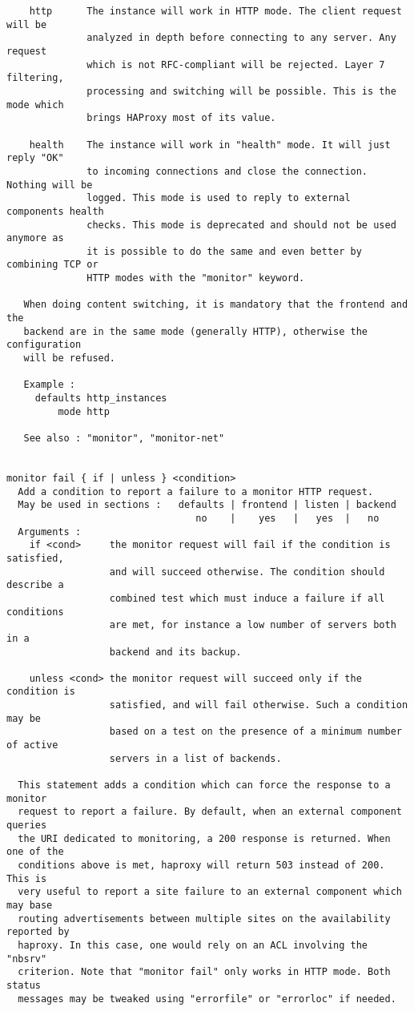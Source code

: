 \begin{verbatim}
    http      The instance will work in HTTP mode. The client request will be
              analyzed in depth before connecting to any server. Any request
              which is not RFC-compliant will be rejected. Layer 7 filtering,
              processing and switching will be possible. This is the mode which
              brings HAProxy most of its value.

    health    The instance will work in "health" mode. It will just reply "OK"
              to incoming connections and close the connection. Nothing will be
              logged. This mode is used to reply to external components health
              checks. This mode is deprecated and should not be used anymore as
              it is possible to do the same and even better by combining TCP or
              HTTP modes with the "monitor" keyword.

   When doing content switching, it is mandatory that the frontend and the
   backend are in the same mode (generally HTTP), otherwise the configuration
   will be refused.

   Example :
     defaults http_instances
         mode http

   See also : "monitor", "monitor-net"


monitor fail { if | unless } <condition>
  Add a condition to report a failure to a monitor HTTP request.
  May be used in sections :   defaults | frontend | listen | backend
                                 no    |    yes   |   yes  |   no
  Arguments :
    if <cond>     the monitor request will fail if the condition is satisfied,
                  and will succeed otherwise. The condition should describe a
                  combined test which must induce a failure if all conditions
                  are met, for instance a low number of servers both in a
                  backend and its backup.

    unless <cond> the monitor request will succeed only if the condition is
                  satisfied, and will fail otherwise. Such a condition may be
                  based on a test on the presence of a minimum number of active
                  servers in a list of backends.

  This statement adds a condition which can force the response to a monitor
  request to report a failure. By default, when an external component queries
  the URI dedicated to monitoring, a 200 response is returned. When one of the
  conditions above is met, haproxy will return 503 instead of 200. This is
  very useful to report a site failure to an external component which may base
  routing advertisements between multiple sites on the availability reported by
  haproxy. In this case, one would rely on an ACL involving the "nbsrv"
  criterion. Note that "monitor fail" only works in HTTP mode. Both status
  messages may be tweaked using "errorfile" or "errorloc" if needed.


\end{verbatim}
